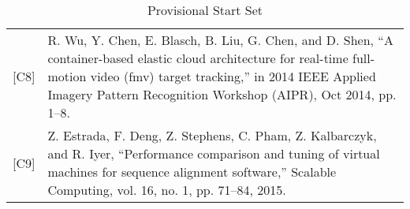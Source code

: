 \begin{table}[]
\begin{tabular}{lp{13cm}}
{[}C8{]}  & R. Wu, Y. Chen, E. Blasch, B. Liu, G. Chen, and D. Shen, “A container-based elastic cloud architecture for real-time full-motion video (fmv) target tracking,” in 2014 IEEE Applied Imagery Pattern Recognition Workshop (AIPR), Oct 2014, pp. 1–8.                                                                                  \\
{[}C9{]} & Z. Estrada, F. Deng, Z. Stephens, C. Pham, Z. Kalbarczyk, and R. Iyer, “Performance comparison and tuning of virtual machines for sequence alignment software,” Scalable Computing, vol. 16, no. 1, pp. 71–84, 2015.

\end{tabular}
\centering
\caption{Provisional Start Set}
\label{lr-startset}
\end{table}



